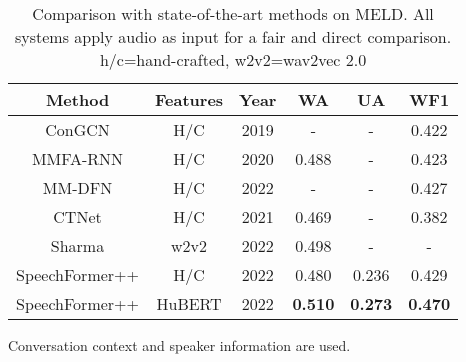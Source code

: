 \documentclass[lettersize,journal]{IEEEtran}
\begin{document}
\begin{table}[t]
    \caption{Comparison with state-of-the-art methods on MELD. All systems apply audio as input for a fair and direct comparison. h/c=hand-crafted, w2v2=wav2vec 2.0}
    \label{tab_4}
    \centering
    \begin{threeparttable}
    \begin{tabular}{ccc||ccc}
    \hline
    Method   & Features  & Year  & WA & UA & WF1        \\ \hline
    \tnote{}\; ConGCN\cite{ConGCN} & H/C & 2019 & - & - & 0.422    \\
    MMFA-RNN\cite{MMFA-RNN} & H/C & 2020 & 0.488  & - & 0.423    \\
    \tnote{}\; MM-DFN\cite{MM-DFN} & H/C & 2022 & -  & - & 0.427    \\
    \tnote{}\; CTNet\cite{ctnet} & H/C & 2021  & 0.469 & - & 0.382 \\
    Sharma\cite{sota_w2v2_meld_1} & w2v2 & 2022 & 0.498 & - & - \\ \hline
    SpeechFormer++  & H/C  & 2022 & 0.480 & 0.236 & 0.429   \\
    SpeechFormer++  & HuBERT  & 2022 & \textbf{0.510} & \textbf{0.273} & \textbf{0.470}    \\ \hline
    \end{tabular}
    \begin{tablenotes}
        \footnotesize
        \item[] Conversation context and speaker information are used.
    \end{tablenotes}
    \end{threeparttable}
\end{table}

\begin{table}[t]
    \caption{Performance and computational efficiency of Transformer and SpeechFormer++ using HuBERT features on Pitt.\\Gain indicates the relative improvement (+) or reduction (-)}
    \label{tab_5}
    \centering
\end{table}
\end{document}
